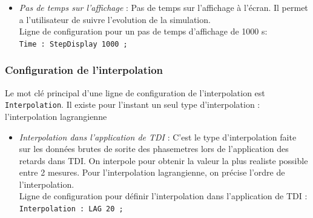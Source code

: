 \documentclass[a4paper,english,12pt]{article}
\begin{document}
\begin{itemize}
\item { \it Pas de temps sur l'affichage} : Pas de temps sur l'affichage \`a l'\'ecran. Il permet a l'utilisateur de suivre l'evolution de la simulation.\\
Ligne de configuration pour un pas de temps d'affichage de 1000  s: \\
\hphantom{aaaaa}\texttt{Time : StepDisplay 1000 ;}  \\ 
\end{itemize}

\subsubsection{Configuration de l'interpolation}
\label{SSSConfigInterpolation}
Le mot cl\'e principal d'une ligne de configuration de l'interpolation est  \texttt{Interpolation}.   Il existe pour l'instant un seul type d'interpolation : l'interpolation lagrangienne
\begin{itemize}
\item { \it Interpolation dans l'application de TDI } : C'est le type d'interpolation faite sur les donn\'ees brutes de sorite des phasemetres lors de l'application des retards dans TDI. On interpole pour obtenir la valeur la plus realiste possible entre 2 mesures. Pour l'interpolation lagrangienne, on pr\'ecise l'ordre de l'interpolation.\\
Ligne de configuration pour d\'efinir l'interpolation dans l'application de TDI : \\
\hphantom{aaaaa}\texttt{Interpolation : LAG 20 ;}  \\
\end{itemize}

\end{document}
